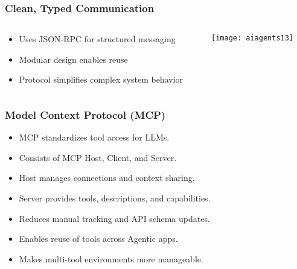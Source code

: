 \begin{frame}[fragile]\frametitle{Clean, Typed Communication}
\begin{columns}
    \begin{column}[T]{0.5\linewidth}
      \begin{itemize}
        \item Uses JSON-RPC for structured messaging
        \item Modular design enables reuse
        \item Protocol simplifies complex system behavior
      \end{itemize}

    \end{column}
    \begin{column}[T]{0.5\linewidth}
		\begin{center}
		\texttt{[image: aiagents13]}
		\end{center}
    \end{column}
  \end{columns}
\end{frame}

\begin{frame}[fragile]\frametitle{Model Context Protocol (MCP)}

      \begin{itemize}
        \item MCP standardizes tool access for LLMs.
        \item Consists of MCP Host, Client, and Server.
        \item Host manages connections and context sharing.
        \item Server provides tools, descriptions, and capabilities.
        \item Reduces manual tracking and API schema updates.
        \item Enables reuse of tools across Agentic apps.
        \item Makes multi-tool environments more manageable.
      \end{itemize}

\end{frame}



